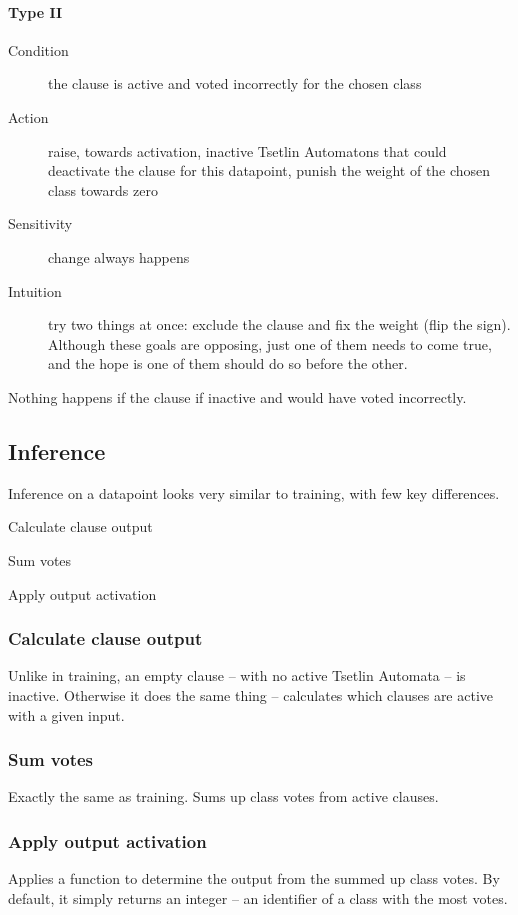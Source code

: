 \documentclass[english]{aghengthesis} %
\begin{document}
\paragraph{Type II}
\begin{description}
    \item[Condition] the clause is active and voted incorrectly for the chosen class
    \item[Action] raise, towards activation, inactive Tsetlin Automatons that could deactivate the clause for this datapoint, punish the weight of the chosen class towards zero
    \item[Sensitivity] change always happens
    \item[Intuition] try two things at once: exclude the clause and fix the weight (flip the sign). Although these goals are opposing, just one of them needs to come true, and the hope is one of them should do so before the other.
\end{description}

Nothing happens if the clause if inactive and would have voted incorrectly.

\subsection{Inference}
Inference on a datapoint looks very similar to training, with few key differences.
\begin{compactenum}
    \item Calculate clause output
    \item Sum votes
    \item Apply output activation
\end{compactenum}

\subsubsection{Calculate clause output}
Unlike in training, an empty clause -- with no active Tsetlin Automata -- is inactive. Otherwise it does the same thing -- calculates which clauses are active with a given input.

\subsubsection{Sum votes}
Exactly the same as training. Sums up class votes from active clauses.

\subsubsection{Apply output activation}
Applies a function to determine the output from the summed up class votes. By default, it simply returns an integer -- an identifier of a class with the most votes.
\end{document}
